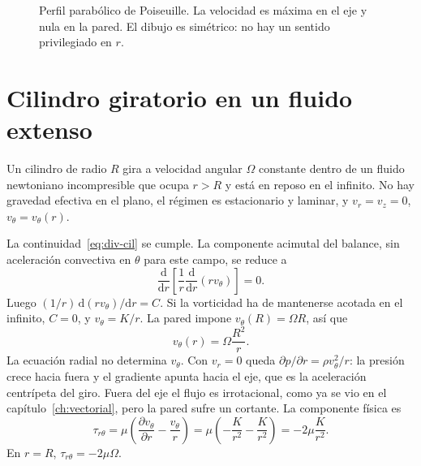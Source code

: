 \begin{figure}[ht]
\centering
{}
\caption{Perfil parabólico de Poiseuille. La velocidad es máxima en el eje y nula en la pared. El dibujo es simétrico: no hay un sentido privilegiado en \(r\).}
\label{fig:poiseuille}
\end{figure}

\section{Cilindro giratorio en un fluido extenso}

Un cilindro de radio \(R\) gira a velocidad angular \(\Omega\) constante dentro de un fluido newtoniano incompresible que ocupa \(r>R\) y está en reposo en el infinito. No hay gravedad efectiva en el plano, el régimen es estacionario y laminar, y \(v_r=v_z=0\), \(v_\theta=v_\theta(r)\).

La continuidad~\eqref{eq:div-cil} se cumple. La componente acimutal del balance, sin aceleración convectiva en \(\theta\) para este campo, se reduce a
\begin{equation}
\label{eq:ode-cilindro}
\frac{\mathrm{d}}{\mathrm{d}r}\left[\frac{1}{r}\frac{\mathrm{d}}{\mathrm{d}r}(r v_\theta)\right]=0.
\end{equation}
Luego \((1/r)\,\mathrm{d}(r v_\theta)/\mathrm{d}r=C\). Si la vorticidad ha de mantenerse acotada en el infinito, \(C=0\), y \(v_\theta=K/r\). La pared impone \(v_\theta(R)=\Omega R\), así que
\begin{equation}
\label{eq:cilindro}
v_\theta(r)=\Omega\frac{R^2}{r}.
\end{equation}
La ecuación radial no determina \(v_\theta\). Con \(v_r=0\) queda \(\partial p/\partial r=\rho v_\theta^2/r\): la presión crece hacia fuera y el gradiente apunta hacia el eje, que es la aceleración centrípeta del giro. Fuera del eje el flujo es irrotacional, como ya se vio en el capítulo~\ref{ch:vectorial}, pero la pared sufre un cortante. La componente física es
\[
\tau_{r\theta}=\mu\left(\frac{\partial v_\theta}{\partial r}-\frac{v_\theta}{r}\right)
=\mu\left(-\frac{K}{r^2}-\frac{K}{r^2}\right)
=-2\mu\frac{K}{r^2}.
\]
En \(r=R\), \(\tau_{r\theta}=-2\mu\Omega\).

